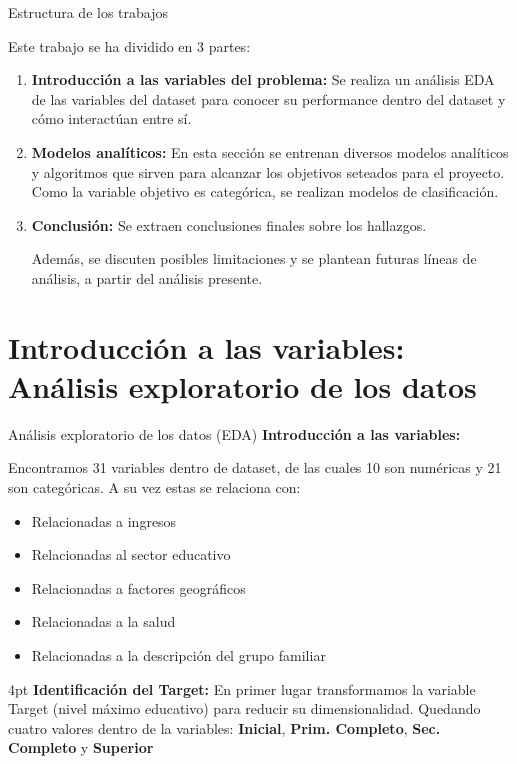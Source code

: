 \documentclass[pdf]{beamer}
\def\vspace{}%
\begin{document}
\begin{frame}{Estructura de los trabajos}

    Este trabajo se ha dividido en 3 partes:
    \begin{enumerate}
        \justifying
        \item \textbf{Introducción a las variables del problema:} Se realiza un análisis EDA de las variables del dataset para  conocer su performance dentro del dataset y cómo interactúan entre sí. 
        \item \textbf{Modelos analíticos:} En esta sección se entrenan diversos modelos analíticos y algoritmos que sirven para alcanzar los objetivos seteados para el proyecto. Como la variable objetivo es categórica, se realizan modelos de clasificación.
        \item \textbf{Conclusión:} Se extraen conclusiones finales sobre los hallazgos.
        
        Además, se discuten posibles limitaciones y se plantean futuras líneas de análisis, a partir del análisis presente.

    \end{enumerate}

\end{frame}

\section{Introducción a las variables: Análisis exploratorio de los datos}

\begin{frame}{Análisis exploratorio de los datos (EDA)}
\textbf{Introducción a las variables:}

Encontramos 31 variables dentro de dataset, de las cuales 10 son numéricas y 21 son categóricas. A su vez estas se relaciona con:
\begin{itemize} 
    \item Relacionadas a ingresos
    \item Relacionadas al sector educativo
    \item Relacionadas a factores geográficos
    \item Relacionadas a la salud
    \item Relacionadas a la descripción del grupo familiar
\end{itemize}
 \vspace{4pt}
 \textbf{Identificación del Target:} En primer lugar transformamos la variable Target (nivel máximo educativo) para reducir su dimensionalidad. Quedando cuatro valores dentro de la variables:  \textbf{Inicial}, \textbf{Prim. Completo}, \textbf{Sec. Completo} y \textbf{Superior}
\end{frame}
 
\end{document}
